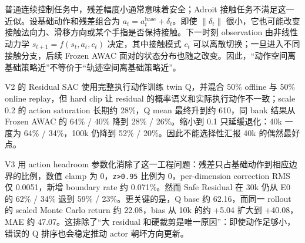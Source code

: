 普通连续控制任务中，残差幅度小通常意味着安全；Adroit 接触任务不满足这一近似。设基础动作和残差组合为 \(a_t=a_t^{\text{base}}+\delta_t\)。即使 \(\lVert\delta_t\rVert\) 很小，它也可能改变接触法向力、滑移方向或某个手指是否保持接触。下一时刻 observation 由非线性动力学 \(s_{t+1}=f(s_t,a_t,c_t)\) 决定，其中接触模式 \(c_t\) 可以离散切换；一旦进入不同接触分支，后续 Frozen AWAC 面对的状态分布也随之改变。因此，``动作空间离基础策略近''不等价于``轨迹空间离基础策略近''。

V2 的 Residual SAC 使用完整执行动作训练 twin Q，并混合 50\% offline 与 50\% online replay，但 hard clip 让 residual 的概率语义和实际执行动作不一致；scale 0.2 的 action saturation 长期约 28\%，Q mean 最终升到约 610，同 bank 结果从 Frozen AWAC 的 64\% / 40\% 降到 28\% / 26\%。缩小到 0.1 只延缓退化：40k 一度为 64\% / 34\%，100k 仍降到 52\% / 20\%。因此不能选择性汇报 40k 的偶然最好点。

V3 用 action headroom 参数化消除了这一工程问题：残差只占基础动作到相应边界的比例，数值 clamp 为 0，\texttt{\textbar{}z\textbar{}\textgreater{}0.95} 比例为 0，per-dimension correction RMS 仅 0.0051，新增 boundary rate 约 0.071\%。然而 Safe Residual 在 30k 仍从 E0 的 62\% / 34\% 退到 59\% / 23\%。更关键的是，Q base 约 62.16，而同一 rollout 的 scaled Monte Carlo return 约 22.08，bias 从 10k 的约 +5.04 扩大到 +40.08，MAE 约 47.07。这排除了``大 residual 和硬裁剪是唯一原因''：即使动作足够小，错误的 Q 排序也会稳定推动 actor 朝坏方向更新。

\autocite{haarnoja2018sac}
